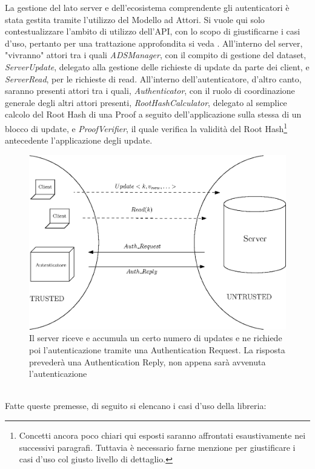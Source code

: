 	La gestione del lato server e dell'ecosistema comprendente gli autenticatori è stata gestita tramite l'utilizzo del Modello ad Attori. Si vuole qui solo contestualizzare l'ambito di utilizzo dell'API, con lo scopo di giustificarne i casi d'uso, pertanto per una trattazione approfondita si veda \cite{pipelineintegrity_thesis}. All'interno del server, "vivranno" attori tra i quali \textit{ADSManager}, con il compito di gestione del dataset, \textit{ServerUpdate}, delegato alla gestione delle richieste di update da parte dei client, e \textit{ServerRead}, per le richieste di read. All'interno dell'autenticatore, d'altro canto, saranno presenti attori tra i quali, \textit{Authenticator}, con il ruolo di coordinazione generale degli altri attori presenti, \textit{RootHashCalculator}, delegato al semplice calcolo del Root Hash di una Proof a seguito dell'applicazione sulla stessa di un blocco di update, e \textit{ProofVerifier}, il quale verifica la validità del Root Hash\footnote{Concetti ancora poco chiari qui esposti saranno affrontati esaustivamente nei successivi paragrafi. Tuttavia è necessario farne menzione per giustificare i casi d'uso col giusto livello di dettaglio.} antecedente l'applicazione degli update.
	
	\begin{figure}
		\centering
		\includegraphics[scale=0.6]{figure/semicircles.eps}
		\caption{Il server riceve e accumula un certo numero di updates e ne richiede poi l'autenticazione tramite una Authentication Request. La risposta prevederà una Authentication Reply, non appena sarà avvenuta l'autenticazione}\label{fig:semicircles}
	\end{figure}
	\\
	Fatte queste premesse, di seguito si elencano i casi d'uso della libreria:
	
